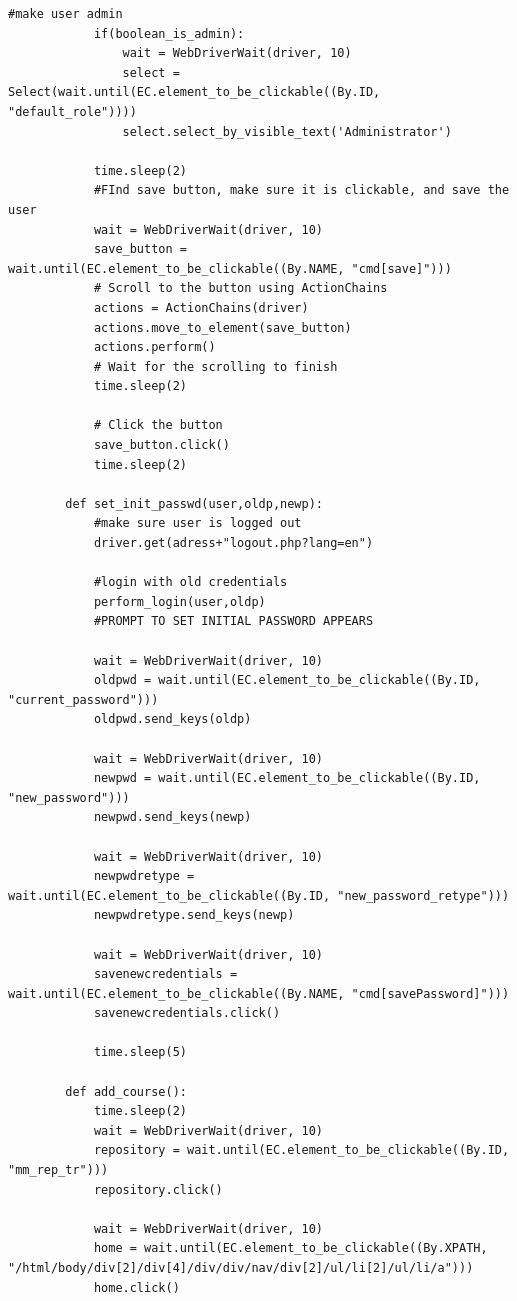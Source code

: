 \documentclass[10pt, a4paper,onecolumn ,titlepage]{article}
\begin{document}
\begin{lstlisting}[label={lst:SeleniumSkript}]
            #make user admin
            if(boolean_is_admin):
                wait = WebDriverWait(driver, 10)
                select = Select(wait.until(EC.element_to_be_clickable((By.ID, "default_role"))))
                select.select_by_visible_text('Administrator')

            time.sleep(2)
            #FInd save button, make sure it is clickable, and save the user
            wait = WebDriverWait(driver, 10)
            save_button = wait.until(EC.element_to_be_clickable((By.NAME, "cmd[save]")))
            # Scroll to the button using ActionChains
            actions = ActionChains(driver)
            actions.move_to_element(save_button)
            actions.perform()
            # Wait for the scrolling to finish
            time.sleep(2)

            # Click the button
            save_button.click()
            time.sleep(2)

        def set_init_passwd(user,oldp,newp):
            #make sure user is logged out
            driver.get(adress+"logout.php?lang=en")

            #login with old credentials
            perform_login(user,oldp)
            #PROMPT TO SET INITIAL PASSWORD APPEARS

            wait = WebDriverWait(driver, 10)
            oldpwd = wait.until(EC.element_to_be_clickable((By.ID, "current_password")))
            oldpwd.send_keys(oldp)

            wait = WebDriverWait(driver, 10)
            newpwd = wait.until(EC.element_to_be_clickable((By.ID, "new_password")))
            newpwd.send_keys(newp)

            wait = WebDriverWait(driver, 10)
            newpwdretype = wait.until(EC.element_to_be_clickable((By.ID, "new_password_retype")))
            newpwdretype.send_keys(newp)

            wait = WebDriverWait(driver, 10)
            savenewcredentials = wait.until(EC.element_to_be_clickable((By.NAME, "cmd[savePassword]")))
            savenewcredentials.click()

            time.sleep(5)

        def add_course():
            time.sleep(2)
            wait = WebDriverWait(driver, 10)
            repository = wait.until(EC.element_to_be_clickable((By.ID, "mm_rep_tr")))
            repository.click()

            wait = WebDriverWait(driver, 10)
            home = wait.until(EC.element_to_be_clickable((By.XPATH, "/html/body/div[2]/div[4]/div/div/nav/div[2]/ul/li[2]/ul/li/a")))
            home.click()


\end{lstlisting}
\end{document}
